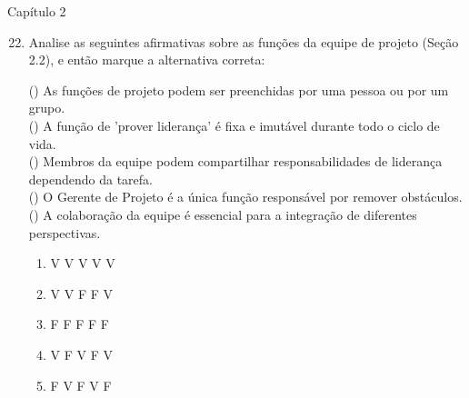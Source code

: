 \documentclass{beamer}
\begin{document}
\begin{frame}{Capítulo 2}
	\begin{enumerate}
		\setcounter{enumi}{21}
		\justifying
		\item Analise as seguintes afirmativas sobre as funções da equipe de projeto (Seção 2.2), e então marque a alternativa correta:
		
		\vspace{10pt} \footnotesize
		(\hspace{10pt}) As funções de projeto podem ser preenchidas por uma pessoa ou por um grupo.\\
		(\hspace{10pt}) A função de 'prover liderança' é fixa e imutável durante todo o ciclo de vida.\\
		(\hspace{10pt}) Membros da equipe podem compartilhar responsabilidades de liderança dependendo da tarefa.\\
		(\hspace{10pt}) O Gerente de Projeto é a única função responsável por remover obstáculos.\\
		(\hspace{10pt}) A colaboração da equipe é essencial para a integração de diferentes perspectivas.
		
		\vspace{10pt} \normalsize
		\begin{enumerate}[a]
			\justifying
			\item V V V V V
			\item V V F F V
			\item F F F F F
			\item \alert<2>{V F V F V}
			\item F V F V F
		\end{enumerate}
	\end{enumerate}
\end{frame}
\end{document}

